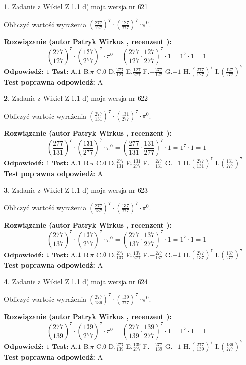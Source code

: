\documentclass[12pt, a4paper]{article}
\theoremstyle{definition} %
\newtheorem{zad}{}
\newcommand{\zadStart}[1]{\begin{zad}#1\newline}
\newcommand{\zadStop}{\end{zad}}
\newcommand{\rozwStart}[2]{\noindent \textbf{Rozwiązanie (autor #1 , recenzent #2): }\newline}
\newcommand{\rozwStop}{\newline}
\newcommand{\odpStart}{\noindent \textbf{Odpowiedź:}\newline}
\newcommand{\odpStop}{\newline}
\newcommand{\testStart}{\noindent \textbf{Test:}\newline}
\newcommand{\testStop}{\newline}
\newcommand{\kluczStart}{\noindent \textbf{Test poprawna odpowiedź:}\newline}
\newcommand{\kluczStop}{\newline}
\begin{document}
\zadStart{Zadanie z Wikieł Z 1.1 d) moja wersja nr 621}

Obliczyć wartość wyrażenia $(\frac{277}{127})^{7} \cdot (\frac{127}{277})^{7} \cdot \pi^{0}$.
\zadStop
\rozwStart{Patryk Wirkus}{}
$$(\frac{277}{127})^{7} \cdot (\frac{127}{277})^{7} \cdot \pi^{0} = (\frac{277}{127} \cdot \frac{127}{277})^{7} \cdot 1 = 1^{7} \cdot 1 = 1$$
\rozwStop
\odpStart
$1$
\odpStop
\testStart
A.$1$ B.$\pi$ C.$0$ D.$\frac{277}{127}$ E.$\frac{127}{277}$
F.$-\frac{277}{127}$ G.$-1$
H.$(\frac{277}{127})^{7}$
I.$(\frac{127}{277})^{7}$
\testStop
\kluczStart
A
\kluczStop



\zadStart{Zadanie z Wikieł Z 1.1 d) moja wersja nr 622}

Obliczyć wartość wyrażenia $(\frac{277}{131})^{7} \cdot (\frac{131}{277})^{7} \cdot \pi^{0}$.
\zadStop
\rozwStart{Patryk Wirkus}{}
$$(\frac{277}{131})^{7} \cdot (\frac{131}{277})^{7} \cdot \pi^{0} = (\frac{277}{131} \cdot \frac{131}{277})^{7} \cdot 1 = 1^{7} \cdot 1 = 1$$
\rozwStop
\odpStart
$1$
\odpStop
\testStart
A.$1$ B.$\pi$ C.$0$ D.$\frac{277}{131}$ E.$\frac{131}{277}$
F.$-\frac{277}{131}$ G.$-1$
H.$(\frac{277}{131})^{7}$
I.$(\frac{131}{277})^{7}$
\testStop
\kluczStart
A
\kluczStop



\zadStart{Zadanie z Wikieł Z 1.1 d) moja wersja nr 623}

Obliczyć wartość wyrażenia $(\frac{277}{137})^{7} \cdot (\frac{137}{277})^{7} \cdot \pi^{0}$.
\zadStop
\rozwStart{Patryk Wirkus}{}
$$(\frac{277}{137})^{7} \cdot (\frac{137}{277})^{7} \cdot \pi^{0} = (\frac{277}{137} \cdot \frac{137}{277})^{7} \cdot 1 = 1^{7} \cdot 1 = 1$$
\rozwStop
\odpStart
$1$
\odpStop
\testStart
A.$1$ B.$\pi$ C.$0$ D.$\frac{277}{137}$ E.$\frac{137}{277}$
F.$-\frac{277}{137}$ G.$-1$
H.$(\frac{277}{137})^{7}$
I.$(\frac{137}{277})^{7}$
\testStop
\kluczStart
A
\kluczStop



\zadStart{Zadanie z Wikieł Z 1.1 d) moja wersja nr 624}

Obliczyć wartość wyrażenia $(\frac{277}{139})^{7} \cdot (\frac{139}{277})^{7} \cdot \pi^{0}$.
\zadStop
\rozwStart{Patryk Wirkus}{}
$$(\frac{277}{139})^{7} \cdot (\frac{139}{277})^{7} \cdot \pi^{0} = (\frac{277}{139} \cdot \frac{139}{277})^{7} \cdot 1 = 1^{7} \cdot 1 = 1$$
\rozwStop
\odpStart
$1$
\odpStop
\testStart
A.$1$ B.$\pi$ C.$0$ D.$\frac{277}{139}$ E.$\frac{139}{277}$
F.$-\frac{277}{139}$ G.$-1$
H.$(\frac{277}{139})^{7}$
I.$(\frac{139}{277})^{7}$
\testStop
\kluczStart
A
\kluczStop
\end{document}
